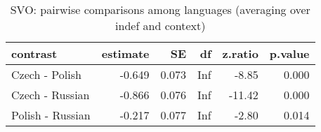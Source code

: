 \begin{table}[!h]
\centering
\caption{SVO: pairwise comparisons among languages (averaging over indef and context)}
\centering
\begin{tabular}[t]{lrrrrr}
\toprule
contrast & estimate & SE & df & z.ratio & p.value\\
\midrule
Czech - Polish & -0.649 & 0.073 & Inf & -8.85 & 0.000\\
Czech - Russian & -0.866 & 0.076 & Inf & -11.42 & 0.000\\
Polish - Russian & -0.217 & 0.077 & Inf & -2.80 & 0.014\\
\bottomrule
\end{tabular}
\end{table}
